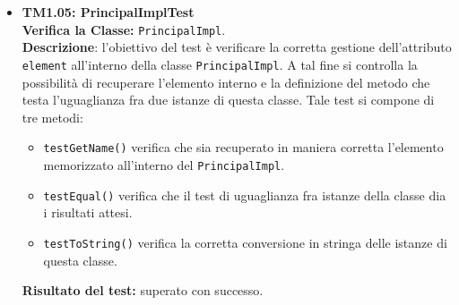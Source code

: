 \begin{itemize}
\item \textbf{TM1.05: PrincipalImplTest}\\
\textbf{Verifica la Classe:} \texttt{PrincipalImpl}.\\
\textbf{Descrizione}: l'obiettivo del test è verificare la corretta gestione dell'attributo \texttt{element} all'interno della classe \texttt{PrincipalImpl}. A tal fine si controlla la possibilità di recuperare l'elemento interno e la definizione del metodo che testa l'uguaglianza fra due istanze di questa classe.
Tale test si compone di tre metodi:
\begin{itemize}
\item \texttt{testGetName()} verifica che sia recuperato in maniera corretta l'elemento memorizzato all'interno del \texttt{PrincipalImpl}.
\item \texttt{testEqual()} verifica che il test di uguaglianza fra istanze della classe dia i risultati attesi.
\item \texttt{testToString()} verifica la corretta conversione in stringa delle istanze di questa classe.
\end{itemize}
\textbf{Risultato del test:} superato con successo.
\end{itemize}

